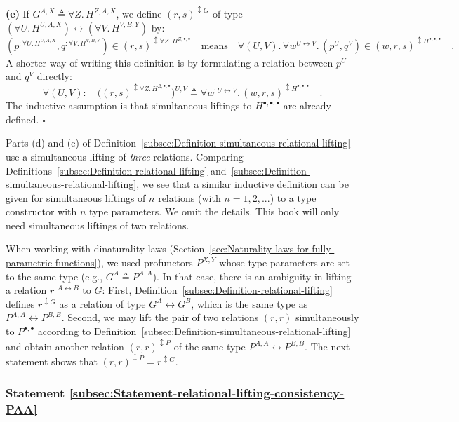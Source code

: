 \textbf{(e)} If $G^{A,X}\triangleq\forall Z.\,H^{Z,A,X}$, we define
$(r,s)^{\updownarrow G}$ of type $(\forall U.\,H^{U,A,X})\leftrightarrow(\forall V.\,H^{V,B,Y})$
by:
\[
(p^{:\forall U.\,H^{U,A,X}},q^{:\forall V.\,H^{V,B,Y}})\in(r,s)^{\updownarrow\forall Z.\,H^{Z,\bullet,\bullet}}\quad\text{means}\quad\forall(U,V).\,\forall w^{U\leftrightarrow V}.\,(p^{U},q^{V})\in(w,r,s)^{\updownarrow H^{\bullet,\bullet,\bullet}}\quad.
\]
A shorter way of writing this definition is by formulating a relation
between $p^{U}$ and $q^{V}$ directly:
\begin{equation}
\forall(U,V):\quad\big((r,s)^{\updownarrow\forall Z.\,H^{Z,\bullet,\bullet}}\big)^{U,V}\triangleq\forall w^{:U\leftrightarrow V}.\,(w,r,s)^{\updownarrow H^{\bullet,\bullet,\bullet}}\quad.\label{eq:relational-lifting-quantified-types-short-1}
\end{equation}
The inductive assumption is that simultaneous liftings to $H^{\bullet,\bullet,\bullet}$
are already defined. $\square$

Parts (d) and (e) of Definition~\ref{subsec:Definition-simultaneous-relational-lifting}
use a simultaneous lifting of \emph{three} relations. Comparing Definitions~\ref{subsec:Definition-relational-lifting}
and~\ref{subsec:Definition-simultaneous-relational-lifting}, we
see that a similar inductive definition can be given for simultaneous
liftings of $n$ relations (with $n=1,2,...$) to a type constructor
with $n$ type parameters. We omit the details. This book will only
need simultaneous liftings of two relations.

When working with dinaturality laws (Section~\ref{sec:Naturality-laws-for-fully-parametric-functions}),
we used profunctors $P^{X,Y}$ whose type parameters are set to the
same type (e.g., $G^{A}\triangleq P^{A,A}$). In that case, there
is an ambiguity in lifting a relation $r^{:A\leftrightarrow B}$ to
$G$: First, Definition~\ref{subsec:Definition-relational-lifting}
defines $r^{\updownarrow G}$ as a relation of type $G^{A}\leftrightarrow G^{B}$,
which is the same type as $P^{A,A}\leftrightarrow P^{B,B}$. Second,
we may lift the pair of two relations $\left(r,r\right)$ simultaneously
to $P^{\bullet,\bullet}$ according to Definition~\ref{subsec:Definition-simultaneous-relational-lifting}
and obtain another relation $\left(r,r\right)^{\updownarrow P}$ of
the same type $P^{A,A}\leftrightarrow P^{B,B}$. The next statement
shows that $(r,r)^{\updownarrow P}=r^{\updownarrow G}$.

\subsubsection{Statement \label{subsec:Statement-relational-lifting-consistency-PAA}\ref{subsec:Statement-relational-lifting-consistency-PAA}}

